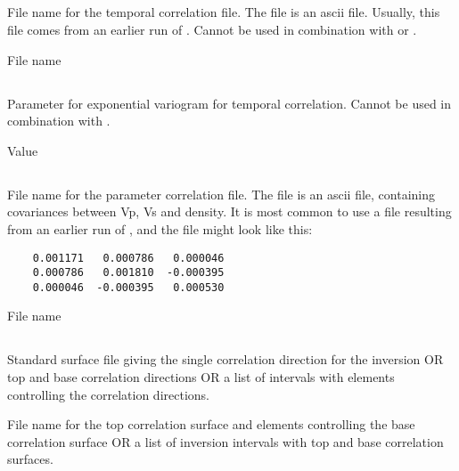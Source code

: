 \subsection{}
 \slist
   \item \Description File name for the temporal correlation file. The file is an ascii file. Usually, this file comes from an earlier run of \crava. Cannot be used in combination with  or .
   \item \Argument File name
   \item \Default
 \elist
 
 \subsection{}
  \slist
    \item \Description Parameter for exponential variogram for temporal correlation. Cannot be used in combination with .
    \item \Argument Value
    \item \Default
 \elist

\subsection{}
 \slist
   \item \Description File name for the parameter correlation file. The file is an ascii file, containing covariances between Vp, Vs and density.
   It is most common to use a file resulting from an earlier run of \crava, and the file might look like this:

  \begin{verbatim}
    0.001171   0.000786   0.000046
  	0.000786   0.001810  -0.000395
  	0.000046  -0.000395   0.000530
  \end{verbatim}
   \item \Argument File name
   \item \Default
 \elist

\subsection{}
 \slist
   \item \Description Standard surface file giving the single correlation direction for the inversion OR top and base correlation directions OR a list of intervals with elements controlling the correlation directions.
   \item \Argument File name for the top correlation surface and elements controlling the base correlation surface OR a list of inversion intervals with top and base correlation surfaces.
   \item \Default
 \elist

